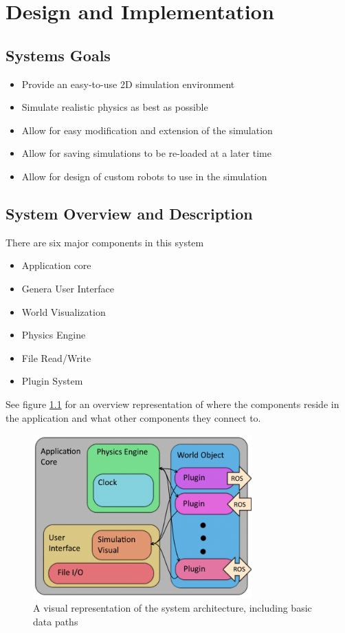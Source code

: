 

\chapter{Design  and Implementation}

\section{Systems Goals}
\begin{itemize}
	\item Provide an easy-to-use 2D simulation environment
	\item Simulate realistic physics as best as possible
	\item Allow for easy modification and extension of the simulation
	\item Allow for saving simulations to be re-loaded at a later time
	\item Allow for design of custom robots to use in the simulation
\end{itemize}

\section{System Overview and Description}
There are six major components in this system
\begin{itemize}
	\item Application core
	\item Genera User Interface
	\item World Visualization
	\item Physics Engine
	\item File Read/Write
	\item Plugin System
\end{itemize}
See figure \ref{fig:systemdiagram} for an overview representation of where the components reside in the application and what other components they connect to.

\begin{figure}[tbh]
\begin{center}
\includegraphics[width=0.75\textwidth]{./images_design/sysarch}
\end{center}
\caption{A visual representation of the system architecture, including basic data paths\label{fig:systemdiagram}}
\end{figure}

